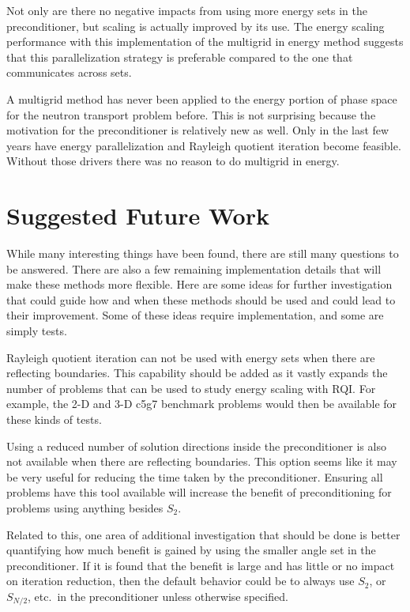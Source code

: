 Not only are there no negative impacts from using more energy sets in the preconditioner, but scaling is actually improved by its use. The energy scaling performance with this implementation of the multigrid in energy method suggests that this parallelization strategy is preferable compared to the one that communicates across sets. 

A multigrid method has never been applied to the energy portion of phase space for the neutron transport problem before. This is not surprising because the motivation for the preconditioner is relatively new as well. Only in the last few years have energy parallelization and Rayleigh quotient iteration become feasible. Without those drivers there was no reason to do multigrid in energy.

\section{Suggested Future Work}
While many interesting things have been found, there are still many questions to be answered. There are also a few remaining implementation details that will make these methods more flexible. Here are some ideas for further investigation that could guide how and when these methods should be used and could lead to their improvement. Some of these ideas require implementation, and some are simply tests.

Rayleigh quotient iteration can not be used with energy sets when there are reflecting boundaries. This capability should be added as it vastly expands the number of problems that can be used to study energy scaling with RQI. For example, the 2-D and 3-D c5g7 benchmark problems would then be available for these kinds of tests. 

Using a reduced number of solution directions inside the preconditioner is also not available when there are reflecting boundaries. This option seems like it may be very useful for reducing the time taken by the preconditioner. Ensuring all problems have this tool available will increase the benefit of preconditioning for problems using anything besides $S_{2}$.

Related to this, one area of additional investigation that should be done is better quantifying how much benefit is gained by using the smaller angle set in the preconditioner. If it is found that the benefit is large and has little or no impact on iteration reduction, then the default behavior could be to always use $S_{2}$, or $S_{N/2}$, etc.\ in the preconditioner unless otherwise specified. 

